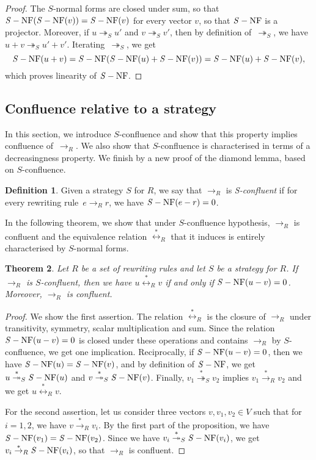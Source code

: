 \documentclass[10pt]{easychair}
\newtheorem{theorem}{Theorem}[section]
\theoremstyle{definition}
\newtheorem{definition}[theorem]{Definition}
\newcommand\rewR{\to_R}
\newcommand\rewS{\twoheadrightarrow_S}
\newcommand\transR{\overset{*}{\to}_R}
\newcommand\transS{\overset{*}{\twoheadrightarrow}_S}
\newcommand\equivR{\overset{*}{\leftrightarrow}_R}
\DeclareMathOperator{\SNF}{{\it S}-NF}
\begin{document}
\begin{proof}
  The $S$-normal forms are closed under sum, so that
  $\SNF(\SNF(v))=\SNF(v)$ for every vector $v$, so that $\SNF$ is a
  projector. Moreover, if $u\rewS u'$ and $v\rewS v'$, then by definition
  of~$\rewS$, we have $u+v\rewS u'+v'$. Iterating~$\rewS$, we get
  \[\SNF(u+v)=\SNF(\SNF(u)+\SNF(v))=\SNF(u)+\SNF(v),
  \smallskip\]
  which proves linearity of $\SNF$.
\end{proof}

\subsection{Confluence relative to a strategy}
\label{sec:confluence_relative_to_a_strategy}

In this section, we introduce $S$-confluence and show that this property
implies confluence of~$\rewR$. We also show that $S$-confluence is
characterised in terms of a decreasingness property. We finish by a new
proof of the diamond lemma, based on $S$-confluence.
\smallskip

\begin{definition}\label{def:standardisation_property}
  Given a strategy $S$ for $R$, we say that $\rewR$ is \emph{S-confluent}
  if for every rewriting rule~$e\rewR r$, we have $\SNF(e-r)=0$.
\end{definition}
\smallskip

In the following theorem, we show that under $S$-confluence hypothesis,
$\rewR$ is confluent and the equivalence relation $\equivR$ that it
induces is entirely characterised by $S$-normal forms. 
\medskip

\begin{theorem}\label{thm:S-confluence_criterion}
  Let $R$ be a set of rewriting rules and let $S$ be a strategy for $R$.
  If $\rewR$ is $S$-confluent, then we have $u\equivR v$ if and only if
  $\SNF(u-v)=0$. Moreover, $\rewR$ is confluent.
\end{theorem}

\begin{proof}
  We show the first assertion. The relation $\equivR$ is the closure of
  $\rewR$ under transitivity, symmetry, scalar multiplication and sum.
  Since the relation $\SNF(u-v)=0$ is closed under these operations and
  contains $\rewR$ by $S$-confluence, we get one implication.
  Reciprocally, if $\SNF(u-v)=0$, then we have $\SNF(u)=\SNF(v)$, and by
  definition of $\SNF$, we get $u\transS\SNF(u)$ and $v\transS\SNF(v)$.
  Finally, $v_1\transS v_2$ implies $v_1\transR v_2$ and we get
  $u\equivR v$.

  For the second assertion, let us consider three vectors
  $v,v_1,v_2\in V$ such that for $i=1,2$, we have $v\transR v_i$. By the
  first part of the proposition, we have $\SNF(v_1)=\SNF(v_2)$. Since we
  have $v_i\transS\SNF(v_i)$, we get $v_i\transR\SNF(v_i)$, so that
  $\rewR$ is confluent.
\end{proof}
\smallskip
\end{document}
